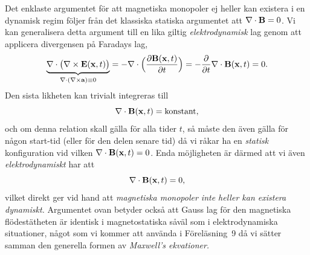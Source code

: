 Det enklaste argumentet f{\"o}r att magnetiska monopoler ej heller kan existera
i en dynamisk regim f{\"o}ljer fr{\aa}n det klassiska statiska argumentet att
$\nabla\cdot{\bf B}=0$. Vi kan generalisera detta argument till en lika giltig
{\it elektrodynamisk} lag genom att applicera divergensen p{\aa} Faradays
lag,
$$
  \underbrace{
    \nabla\cdot\big(\nabla\times{\bf E}({\bf x},t)\big)
  }_{\nabla\cdot(\nabla\times{\bf a})\equiv0}
  =-\nabla\cdot\Big({{\partial{\bf B}({\bf x},t)}\over{\partial t}}\Big)
  =-{{\partial}\over{\partial t}}\nabla\cdot{\bf B}({\bf x},t)
  =0.
$$
Den sista likheten kan trivialt integreras till
$$
  \nabla\cdot{\bf B}({\bf x},t)=\hbox{konstant},
$$
och om denna relation skall g{\"a}lla f{\"o}r alla tider $t$, s{\aa} m{\aa}ste
den {\"a}ven g{\"a}lla f{\"o}r n{\aa}gon start-tid (eller f{\"o}r den delen
senare tid) d{\aa} vi r{\aa}kar ha en {\it statisk} konfiguration vid vilken
$\nabla\cdot{\bf B}({\bf x},t)=0$. Enda m{\"o}jligheten {\"a}r d{\"a}rmed att
vi {\"a}ven {\it elektrodynamiskt} har att
$$
  \nabla\cdot{\bf B}({\bf x},t)=0,
$$
vilket direkt ger vid hand att {\it magnetiska monopoler inte heller kan
existera  dynamiskt.} Argumentet ovan betyder ocks{\aa} att Gauss lag f{\"o}r
den magnetiska fl{\"o}dest{\"a}theten {\"a}r identisk i magnetostatiska
s{\aa}v{\"a}l som i elektrodynamiska situationer, n{\aa}got som vi kommer att
anv{\"a}nda i F{\"o}rel{\"a}sning~9 d{\aa} vi s{\"a}tter samman den generella
formen av {\it Maxwell's ekvationer.}
\vfill\eject

